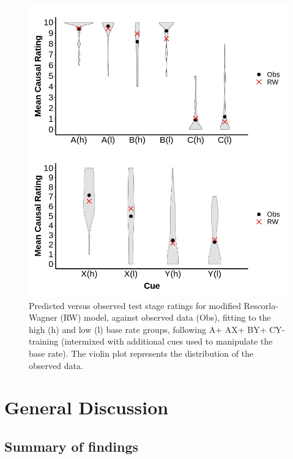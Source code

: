 \documentclass[twocolumn]{article}
\begin{document}
\begin{figure}[t!]
\includegraphics[width=\columnwidth]{fig4.jpg}
\caption{Predicted versus observed test stage ratings for modified
Rescorla-Wagner (RW) model, against observed data (Obs), fitting to the
high (h) and low (l) base rate groups, following A+ AX+ BY+ CY- training
(intermixed with additional cues used to manipulate the base rate). The
violin plot represents the distribution of the observed data.}
\end{figure}

\section{General Discussion}

\subsection{Summary of findings}
\end{document}
